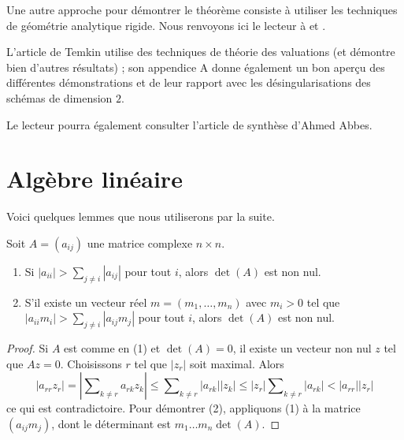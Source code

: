 \medskip\noindent
Une autre approche pour démontrer le théorème consiste à utiliser
les techniques de géométrie analytique rigide. Nous renvoyons ici le lecteur à
\cite{vanderPut} et \cite{Arzdorf-Wewers}.

\medskip\noindent
L'article \cite{Temkin} de Temkin utilise des techniques de théorie des valuations
(et démontre bien d'autres résultats) ; son appendice A donne également
un bon aperçu des différentes démonstrations et de leur rapport avec
les désingularisations des schémas de dimension $2$.

\medskip\noindent
Le lecteur pourra également consulter l'article de synthèse
\cite{Abbes-ssr} d'Ahmed Abbes.






\section{Algèbre linéaire}
\label{section-linear-algebra}

\noindent
Voici quelques lemmes que nous utiliserons par la suite.

\begin{lemma}
\label{lemma-recurring}
\begin{reference}
\cite[Théorème I]{Taussky}
\end{reference}
Soit $A = (a_{ij})$ une matrice complexe $n \times n$.
\begin{enumerate}
\item Si $|a_{ii}| > \sum_{j \not = i} |a_{ij}|$ pour tout $i$, alors
$\det(A)$ est non nul.
\item S'il existe un vecteur réel $m = (m_1, \ldots, m_n)$
avec $m_i > 0$ tel que $|a_{ii} m_i| > \sum_{j \not = i} |a_{ij}m_j|$
pour tout $i$, alors $\det(A)$ est non nul.
\end{enumerate}
\end{lemma}

\begin{proof}
Si $A$ est comme en (1) et $\det(A) = 0$, il existe un vecteur non nul
$z$ tel que $Az = 0$. Choisissons $r$ tel que $|z_r|$ soit maximal. Alors
$$
|a_{rr} z_r| = |\sum\nolimits_{k \not = r} a_{rk}z_k| \leq
\sum\nolimits_{k \not = r} |a_{rk}||z_k| \leq
|z_r| \sum\nolimits_{k \not = r} |a_{rk}| < |a_{rr}||z_r|
$$
ce qui est contradictoire. Pour démontrer (2), appliquons (1) à la matrice
$(a_{ij}m_j)$, dont le déterminant est $m_1 \ldots m_n \det(A)$.
\end{proof}

